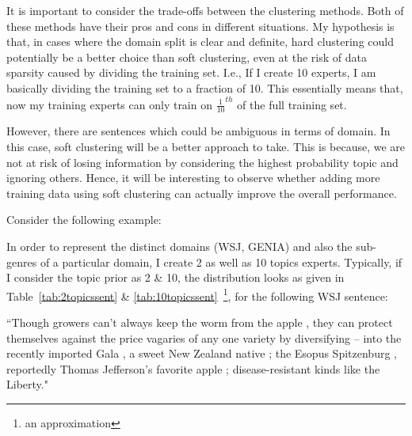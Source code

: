 {It is important to consider the trade-offs between the clustering methods. Both of these methods have their pros and cons in different situations. 
My hypothesis is that, in cases where the domain split is clear and definite, hard clustering could potentially be a better choice than soft clustering, even at the risk of data sparsity caused by dividing the training set. I.e., If I create 10 experts, I am basically dividing the training set to a fraction of 10. This essentially means that, now my training experts can only train on $\frac{1}{10}^{th}$ of the full training set. 

However, there are sentences which could be ambiguous in terms of domain. In this case, soft clustering will be a better approach to take. This is because, we are not at risk of losing information by considering the highest probability topic and ignoring others. Hence, it will be interesting to observe whether adding more training data using soft clustering can actually improve the overall performance. 

Consider the following example:

In order to represent the distinct domains (WSJ, GENIA) and also the sub-genres of a particular domain, I create 2 as well as 10 topics experts. Typically, if I consider the topic prior as 2 \& 10, the distribution looks as given in Table~\ref{tab:2topicssent} \& \ref{tab:10topicssent}~\footnote{an approximation}, for the following WSJ sentence:

``Though growers can't always keep the worm from the apple , they can protect themselves against the price vagaries of any one variety by diversifying -- into the recently imported Gala , a sweet New Zealand native ; the Esopus Spitzenburg , reportedly Thomas Jefferson's favorite apple ; disease-resistant kinds like the Liberty."
 
}
